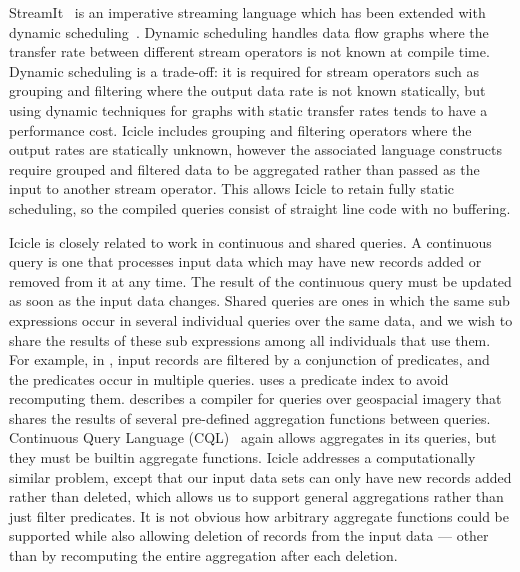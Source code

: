 StreamIt~\cite{thies2002streamit} is an imperative streaming language which has been extended with dynamic scheduling~\cite{soule2013dynamic}.
Dynamic scheduling handles data flow graphs where the transfer rate between different stream operators is not known at compile time.
Dynamic scheduling is a trade-off: it is required for stream operators such as grouping and filtering where the output data rate is not known statically, but using dynamic techniques for graphs with static transfer rates tends to have a performance cost.
Icicle includes grouping and filtering operators where the output rates are statically unknown, however the associated language constructs require grouped and filtered data to be aggregated rather than passed as the input to another stream operator.
This allows Icicle to retain fully static scheduling, so the compiled queries consist of straight line code with no buffering.

Icicle is closely related to work in continuous and shared queries.
A continuous query is one that processes input data which may have new records added or removed from it at any time.
The result of the continuous query must be updated as soon as the input data changes.
Shared queries are ones in which the same sub expressions occur in several individual queries over the same data, and we wish to share the results of these sub expressions among all individuals that use them.
For example, in \citet{munagala2007optimization}, input records are filtered by a conjunction of predicates, and the predicates occur in multiple queries.
\citet{madden2002continuously} uses a predicate index to avoid recomputing them.
\citet{andrade2003efficient} describes a compiler for queries over geospacial imagery that shares the results of several pre-defined aggregation functions between queries.
Continuous Query Language (CQL)~\cite{arasu2002abstract,stream2003stream} again allows aggregates in its queries, but they must be builtin aggregate functions.
Icicle addresses a computationally similar problem, except that our input data sets can only have new records added rather than deleted, which allows us to support general aggregations rather than just filter predicates.
It is not obvious how arbitrary aggregate functions could be supported while also allowing deletion of records from the input data --- other than by recomputing the entire aggregation after each deletion.


